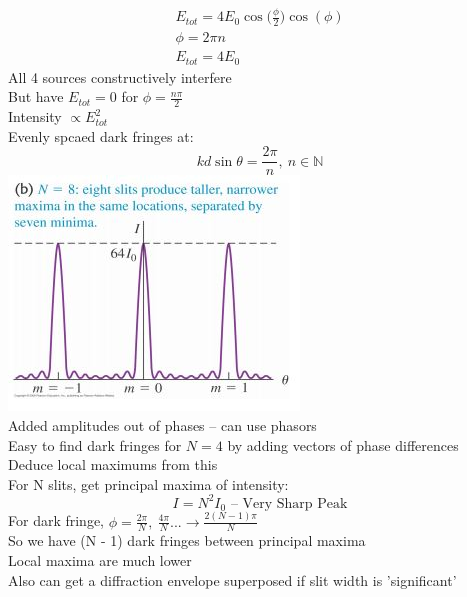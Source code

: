 \documentclass[a4paper, 11pt, fleqn, normalem]{report}
\begin{document}
\begin{gather*}
    E_{tot} = 4E_{0}\cos{\big(\tfrac{\phi}{2}\big)}\cos{(\phi)} \\
    \phi = 2\pi n \\
    E_{tot} = 4E_{0}
\end{gather*}
All 4 sources constructively interfere \\
But have $E_{tot} = 0$ for $\phi = \frac{n\pi}{2}$ \\
Intensity $\propto E_{tot}^{2}$ \\
Evenly spcaed dark fringes at:
\begin{equation*}
    kd\sin{\theta} = \frac{2\pi}{n},~n \in \mathbb{N}
\end{equation*}
\includegraphics{Intense.jpg} \\
Added amplitudes out of phases -- can use phasors \\
Easy to find dark fringes for $N = 4$ by adding vectors of phase differences \\
Deduce local maximums from this \\
For N slits, get principal maxima of intensity:
\begin{equation*}
    I = N^{2}I_{0}\text{ -- Very Sharp Peak}
\end{equation*}
For dark fringe, $\phi = \frac{2\pi}{N},~\frac{4\pi}{N} ...\rightarrow \frac{2(N - 1)\pi}{N}$ \\
So we have (N - 1) dark fringes between principal maxima \\
Local maxima are much lower \\
Also can get a diffraction envelope superposed if slit width is 'significant'
\end{document}
